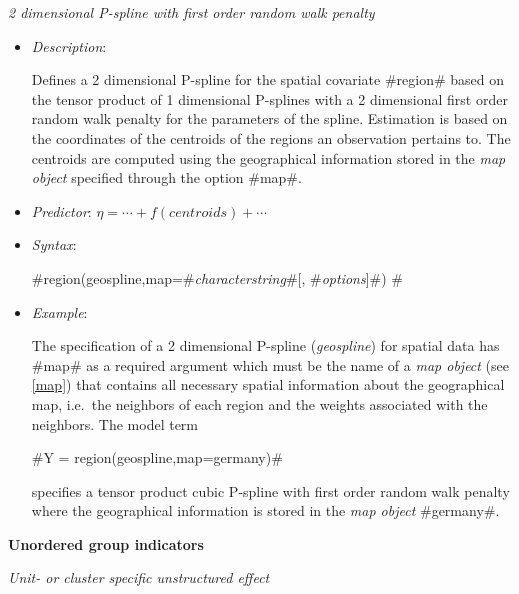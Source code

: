 {\em 2 dimensional P-spline with first order random walk penalty}

\begin{itemize}
\item[] {\em Description}:

Defines a 2 dimensional P-spline for the spatial covariate
#region# based on the tensor product of 1 dimensional P-splines
with a 2 dimensional first order random walk penalty for the
parameters of the spline. Estimation is based on the coordinates
of the centroids of the regions an observation pertains to. The
centroids are computed using the geographical information stored
in the {\em map object} specified through the option #map#.
\item[] {\em Predictor}: $\eta= \cdots + f(centroids) + \cdots$
\item[] {\em Syntax}:

#region(geospline,map=#{\em characterstring}#[, #{\em options}]#) #
\item[] {\em Example}:

The specification of a 2 dimensional P-spline ({\em geospline})
for spatial data has #map# as a required argument which must be
the name of a {\em map object} (see \autoref{map}) that contains
all necessary spatial information about the geographical map,
i.e.~the neighbors of each region and the weights associated with
the neighbors. The model term

#Y = region(geospline,map=germany)#

specifies a tensor product cubic P-spline with first order random
walk penalty where the geographical information is stored in the
{\em map object} #germany#.
\end{itemize}

\vspace{0.5cm}

{\bf Unordered group indicators}
\medskip

{\em Unit- or cluster specific unstructured effect}


